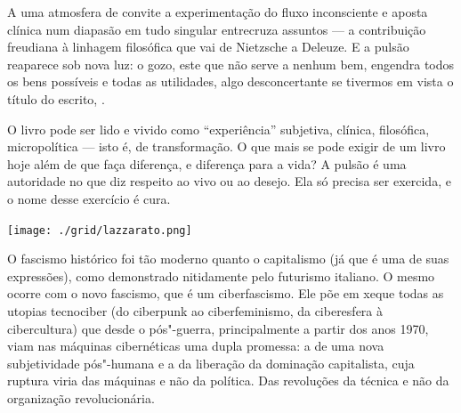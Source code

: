 A uma atmosfera de convite a experimentação do fluxo inconsciente e aposta clínica num diapasão em tudo singular entrecruza assuntos --- a contribuição freudiana à linhagem filosófica que vai de Nietzsche a Deleuze. E a pulsão reaparece sob nova luz: o gozo, este que não serve a nenhum bem, engendra todos os bens possíveis e todas as utilidades, algo desconcertante se tivermos em vista o título do escrito, {}.

O livro pode ser lido e vivido como “experiência” subjetiva, clínica, filosófica, micropolítica --- isto é, de transformação. O que mais se pode exigir de um livro hoje além de que faça diferença, e diferença para a vida? A pulsão é uma autoridade no que diz respeito ao vivo ou ao desejo. Ela só precisa ser exercida, e o nome desse exercício é cura.

\vfill

\hspace*{-.4cm}\begin{minipage}[c]{.5\linewidth}
\small{
{}}
\end{minipage}

\pagebreak %


\begin{center}
\hspace*{.5cm}\texttt{[image: ./grid/lazzarato.png]}
\end{center}

\hspace*{-7cm}\hrulefill\hspace*{-7cm}

\medskip

\noindent{}O fascismo histórico foi tão moderno quanto o capitalismo (já que é uma de suas expressões), como demonstrado nitidamente pelo futurismo italiano. O mesmo ocorre com o novo fascismo, que é um ciberfascismo. Ele põe em xeque todas as utopias tecnociber (do ciberpunk ao ciberfeminismo, da ciberesfera à cibercultura) que desde o pós"-guerra, principalmente a partir dos anos 1970, viam nas máquinas cibernéticas uma dupla promessa: a de uma nova subjetividade pós"-humana e a da liberação da dominação capitalista, cuja ruptura viria das máquinas e não da política. Das revoluções da técnica e não da organização revolucionária.

